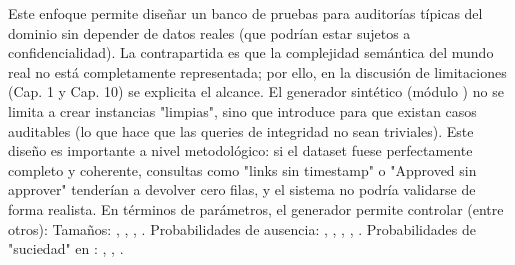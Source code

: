 {}Este enfoque permite diseñar un banco de pruebas para auditorías típicas del dominio sin depender de datos reales (que podrían estar sujetos a confidencialidad). La contrapartida es que la complejidad semántica del mundo real no está completamente representada; por ello, en la discusión de limitaciones (Cap. 1 y Cap. 10) se explicita el alcance.\markdownRendererInterblockSeparator
{}\markdownRendererInterblockSeparator
{}El generador sintético (módulo ) no se limita a crear instancias "limpias", sino que introduce  para que existan casos auditables (lo que hace que las queries de integridad no sean triviales). Este diseño es importante a nivel metodológico: si el dataset fuese perfectamente completo y coherente, consultas como "links sin timestamp" o "Approved sin approver" tenderían a devolver cero filas, y el sistema no podría validarse de forma realista.\markdownRendererInterblockSeparator
{}En términos de parámetros, el generador permite controlar (entre otros):\markdownRendererInterblockSeparator
{}\markdownRendererUlBeginTight
\markdownRendererUlItem Tamaños: , , , .\markdownRendererUlItemEnd 
\markdownRendererUlItem Probabilidades de ausencia: , , , , .\markdownRendererUlItemEnd 
\markdownRendererUlItem Probabilidades de "suciedad" en : , , .\markdownRendererUlItemEnd 
